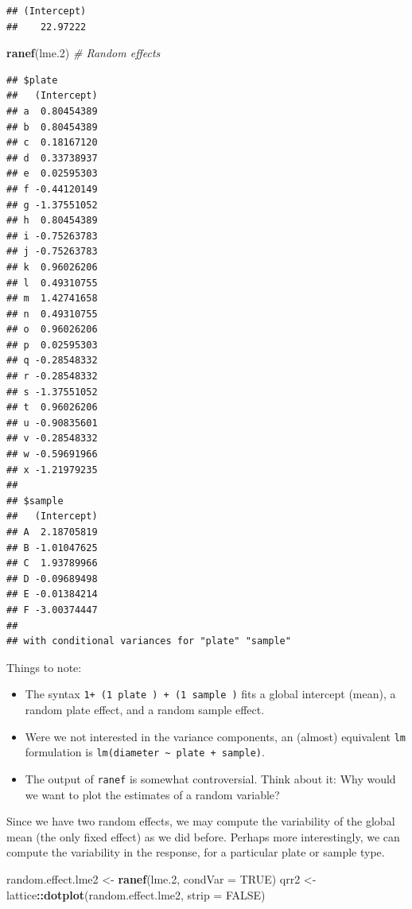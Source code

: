 \documentclass[]{book}
\newenvironment{Shaded}{\begin{snugshade}}{\end{snugshade}}
\newcommand{\CommentTok}[1]{\textcolor[rgb]{0.56,0.35,0.01}{\textit{#1}}}
\newcommand{\DataTypeTok}[1]{\textcolor[rgb]{0.13,0.29,0.53}{#1}}
\newcommand{\FloatTok}[1]{\textcolor[rgb]{0.00,0.00,0.81}{#1}}
\newcommand{\KeywordTok}[1]{\textcolor[rgb]{0.13,0.29,0.53}{\textbf{#1}}}
\newcommand{\NormalTok}[1]{#1}
\newcommand{\OperatorTok}[1]{\textcolor[rgb]{0.81,0.36,0.00}{\textbf{#1}}}
\newcommand{\OtherTok}[1]{\textcolor[rgb]{0.56,0.35,0.01}{#1}}
\newcommand{\StringTok}[1]{\textcolor[rgb]{0.31,0.60,0.02}{#1}}
\providecommand{\tightlist}{%
  \setlength{\itemsep}{0pt}\setlength{\parskip}{0pt}}
\theoremstyle{definition}
\theoremstyle{definition}
\theoremstyle{definition}
\theoremstyle{remark}
\begin{document}
\begin{verbatim}
## (Intercept) 
##    22.97222
\end{verbatim}

\begin{Shaded}
\begin{Highlighting}[]
\KeywordTok{ranef}\NormalTok{(lme}\FloatTok{.2}\NormalTok{) }\CommentTok{# Random effects}
\end{Highlighting}
\end{Shaded}

\begin{verbatim}
## $plate
##   (Intercept)
## a  0.80454389
## b  0.80454389
## c  0.18167120
## d  0.33738937
## e  0.02595303
## f -0.44120149
## g -1.37551052
## h  0.80454389
## i -0.75263783
## j -0.75263783
## k  0.96026206
## l  0.49310755
## m  1.42741658
## n  0.49310755
## o  0.96026206
## p  0.02595303
## q -0.28548332
## r -0.28548332
## s -1.37551052
## t  0.96026206
## u -0.90835601
## v -0.28548332
## w -0.59691966
## x -1.21979235
## 
## $sample
##   (Intercept)
## A  2.18705819
## B -1.01047625
## C  1.93789966
## D -0.09689498
## E -0.01384214
## F -3.00374447
## 
## with conditional variances for "plate" "sample"
\end{verbatim}

Things to note:

\begin{itemize}
\tightlist
\item
  The syntax \texttt{1+\ (1\textbar{}\ plate\ )\ +\ (1\textbar{}\ sample\ )} fits a global intercept (mean), a random plate effect, and a random sample effect.
\item
  Were we not interested in the variance components, an (almost) equivalent \texttt{lm} formulation is \texttt{lm(diameter\ \textasciitilde{}\ plate\ +\ sample)}.
\item
  The output of \texttt{ranef} is somewhat controversial. Think about it: Why would we want to plot the estimates of a random variable?
\end{itemize}

Since we have two random effects, we may compute the variability of the global mean (the only fixed effect) as we did before.
Perhaps more interestingly, we can compute the variability in the response, for a particular plate or sample type.

\begin{Shaded}
\begin{Highlighting}[]
\NormalTok{random.effect.lme2 <-}\StringTok{ }\KeywordTok{ranef}\NormalTok{(lme}\FloatTok{.2}\NormalTok{, }\DataTypeTok{condVar =} \OtherTok{TRUE}\NormalTok{) }
\NormalTok{qrr2 <-}\StringTok{ }\NormalTok{lattice}\OperatorTok{::}\KeywordTok{dotplot}\NormalTok{(random.effect.lme2, }\DataTypeTok{strip =} \OtherTok{FALSE}\NormalTok{)}
\end{Highlighting}
\end{Shaded}
\end{document}

